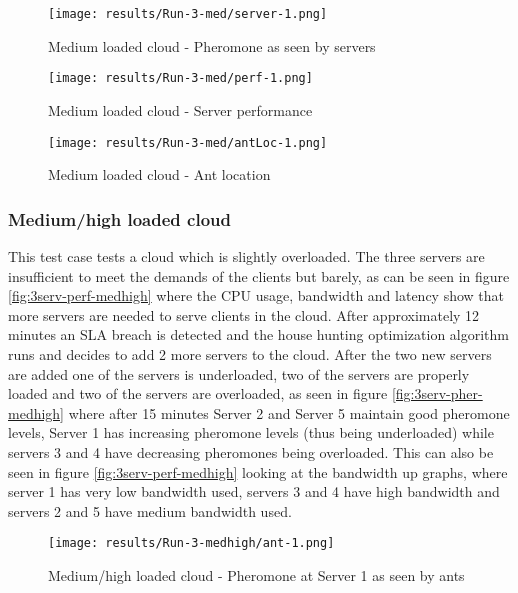 \begin{figure}
	\centering
		\texttt{[image: results/Run-3-med/server-1.png]}
	\caption{Medium loaded cloud - Pheromone as seen by servers}
	\label{fig:3serv-pher-med}
\end{figure}

\begin{figure}
	\centering
		\texttt{[image: results/Run-3-med/perf-1.png]}
	\caption{Medium loaded cloud - Server performance}
	\label{fig:3serv-perf-med}
\end{figure}

\begin{figure}
	\centering
		\texttt{[image: results/Run-3-med/antLoc-1.png]}
	\caption{Medium loaded cloud - Ant location}
	\label{fig:3serv-antloc-med}
\end{figure}

\subsubsection{Medium/high loaded cloud}

This test case tests a cloud which is slightly overloaded. The three servers are insufficient to meet the demands of the clients but barely, as can be seen in figure \ref{fig:3serv-perf-medhigh} where the CPU usage, bandwidth and latency show that more servers are needed to serve clients in the cloud. After approximately 12 minutes an SLA breach is detected and the house hunting optimization algorithm runs and decides to add 2 more servers to the cloud. After the two new servers are added one of the servers is underloaded, two of the servers are properly loaded and two of the servers are overloaded, as seen in figure \ref{fig:3serv-pher-medhigh} where after 15 minutes Server 2 and Server 5 maintain good pheromone levels, Server 1 has increasing pheromone levels (thus being underloaded) while servers 3 and 4 have decreasing pheromones being overloaded. This can also be seen in figure \ref{fig:3serv-perf-medhigh} looking at the bandwidth up graphs, where server 1 has very low bandwidth used, servers 3 and 4 have high bandwidth and servers 2 and 5 have medium bandwidth used.

\begin{figure}[!ht]
	\centering
		\texttt{[image: results/Run-3-medhigh/ant-1.png]}
	\caption{Medium/high loaded cloud - Pheromone at Server 1 as seen by ants}
	\label{fig:3serv-ant1-medhigh}
\end{figure}

